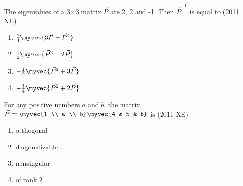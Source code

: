 \item The eigenvalues of a 3×3 matrix $\vec{P}$ are 2, 2 and -1. Then $\vec{P}^{-1}$ is equal to 
\hfill{(2011 XE)} 
\begin{multicols}{4}
\begin{enumerate}
\item $\frac{1}{4}\myvec{3\vec{P} - \vec{P}^2}$ 
\item $\frac{1}{2}\myvec{\vec{P}^2 - 2\vec{P}}$ 
\item $-\frac{1}{2}\myvec{\vec{P}^2 + 3\vec{P}}$ 
\item $-\frac{1}{4}\myvec{\vec{P}^2 + 2\vec{P}}$
\end{enumerate}
\end{multicols}
\item For any positive numbers $a$ and $b$, the matrix 
	$\vec{P} = \myvec{1 \\ a \\ b} \myvec{4 & 5 & 6}$ is 
\hfill{(2011 XE)} 
\begin{multicols}{4}
\begin{enumerate}
\item orthogonal 
\item diagonalizable 
\item nonsingular 
\item of rank 2
\end{enumerate}
\end{multicols}

